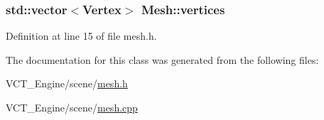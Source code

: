 \hypertarget{class_mesh_a6465a888c97232a39e12aad008c969c3}{}
\subsubsection[{vertices}]{\setlength{\rightskip}{0pt plus 5cm}std\+::vector$<${\bf Vertex}$>$ Mesh\+::vertices}\label{class_mesh_a6465a888c97232a39e12aad008c969c3}


Definition at line 15 of file mesh.\+h.



The documentation for this class was generated from the following files\+:\begin{DoxyCompactItemize}
\item 
V\+C\+T\+\_\+\+Engine/scene/\hyperlink{mesh_8h}{mesh.\+h}\item 
V\+C\+T\+\_\+\+Engine/scene/\hyperlink{mesh_8cpp}{mesh.\+cpp}\end{DoxyCompactItemize}
